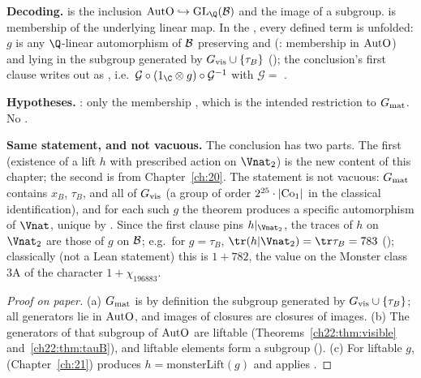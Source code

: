 \begin{dictionary}
\textbf{Decoding.}   is the inclusion $\chtwentytwoAutO\hookrightarrow\mathrm{GL}_\Q(\chtwentytwoB)$ and
 the image of a subgroup.   is membership of the underlying linear
map.  In the , every defined term is unfolded: $g$ is any $\Q$-linear automorphism of $\mathcal{B}$
preserving  and  (: membership in $\mathrm{AutO}$) and lying in the subgroup generated by
$G_{\mathrm{vis}}\cup\{\tau_B\}$ (); the conclusion's first clause writes  out as
, i.e.\ $\mathcal G\circ(1_\C\otimes
g)\circ\mathcal G^{-1}$ with $\mathcal G=$ .

\textbf{Hypotheses.}  : only the membership , which is the intended restriction to
$G_{\mathrm{mat}}$.  No .

\textbf{Same statement, and not vacuous.}  The conclusion has two parts.  The first (existence of a lift $h$ with prescribed
action on $\Vnat_2$) is the new content of this chapter; the second is  from Chapter~\ref{ch:20}.  The
statement is not vacuous: $G_{\mathrm{mat}}$ contains $x_B$, $\tau_B$, and all of $G_{\mathrm{vis}}$ (a group of order
$2^{25}\cdot|\mathrm{Co}_1|$ in the classical identification), and for each such $g$ the theorem produces a specific
automorphism of $\Vnat$, unique by .  Since the first clause pins $h|_{\Vnat_2}$, the
traces of $h$ on $\Vnat_2$ are those of $g$ on $\mathcal{B}$; e.g.\ for $g=\tau_B$, $\tr(h|\Vnat_2)=\tr\tau_B=783$
(); classically (not a Lean statement) this is $1+782$, the value on the Monster class 3A of the
character $1+\chi_{196883}$.
\end{dictionary}
\begin{proof}[Proof on paper]
(a) $G_{\mathrm{mat}}$ is by definition the subgroup generated by $G_{\mathrm{vis}}\cup\{\tau_B\}$; all generators lie in
$\mathrm{AutO}$, and images of closures are closures of images.  (b) The generators of that subgroup of
$\mathrm{AutO}$ are liftable (Theorems~\ref{ch22:thm:visible} and~\ref{ch22:thm:tauB}), and liftable elements form a
subgroup ().  (c) For liftable $g$, 
(Chapter~\ref{ch:21}) produces $h=\mathrm{monsterLift}(g)$ and applies .
\end{proof}
